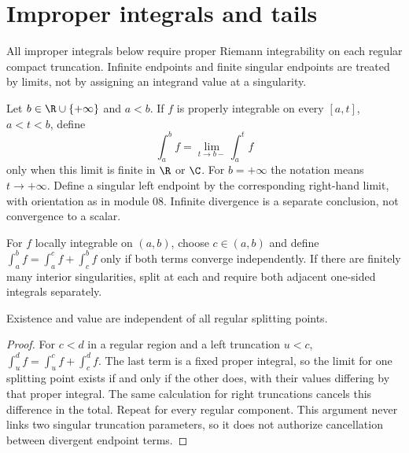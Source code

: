 \chapter{Improper integrals and tails}
All improper integrals below require proper Riemann integrability on each
regular compact truncation. Infinite endpoints and finite singular endpoints
are treated by limits, not by assigning an integrand value at a singularity.

\begin{definition}
Let $b\in\R\cup\{+\infty\}$ and $a<b$. If $f$ is properly integrable
on every $[a,t]$, $a<t<b$, define
\[\int_a^bf=\lim_{t\to b-}\int_a^tf
\]
only when this limit is finite in $\R$ or $\C$. For $b=+\infty$ the
notation means $t\to+\infty$. Define a singular left endpoint by the
corresponding right-hand limit, with orientation as in module 08.
Infinite divergence is a separate conclusion, not convergence to a scalar.
\end{definition}

\begin{definition}
For $f$ locally integrable on $(a,b)$, choose $c\in(a,b)$ and define
$\int_a^bf=\int_a^cf+\int_c^bf$ only if both terms converge
independently. If there are finitely many interior singularities, split
at each and require both adjacent one-sided integrals separately.
\end{definition}
\begin{proposition}
Existence and value are independent of all regular splitting points.
\end{proposition}
\begin{proof}
For $c<d$ in a regular region and a left truncation $u<c$,
$\int_u^df=\int_u^cf+\int_c^df$. The last term is a fixed proper
integral, so the limit for one splitting point exists if and only if
the other does, with their values differing by that proper integral.
The same calculation for right truncations cancels this difference in
the total. Repeat for every regular component. This argument never
links two singular truncation parameters, so it does not authorize
cancellation between divergent endpoint terms.
\end{proof}

